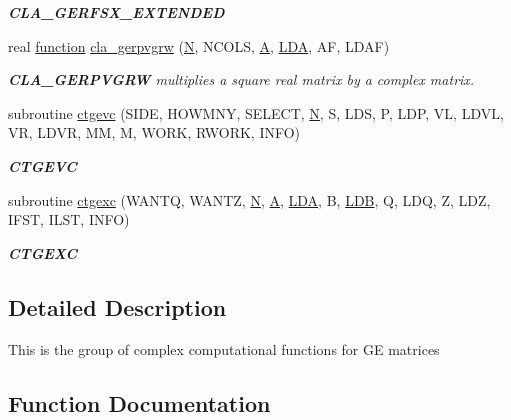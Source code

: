 \begin{DoxyCompactItemize}
\begin{DoxyCompactList}\small\item\em {\bfseries C\+L\+A\+\_\+\+G\+E\+R\+F\+S\+X\+\_\+\+E\+X\+T\+E\+N\+D\+E\+D} \end{DoxyCompactList}\item 
real \hyperlink{afunc_8m_a7b5e596df91eadea6c537c0825e894a7}{function} \hyperlink{group__complexGEcomputational_ga30ebdf9137986a237c939500cbd46a41}{cla\+\_\+gerpvgrw} (\hyperlink{polmisc_8c_a0240ac851181b84ac374872dc5434ee4}{N}, N\+C\+O\+L\+S, \hyperlink{classA}{A}, \hyperlink{example__user_8c_ae946da542ce0db94dced19b2ecefd1aa}{L\+D\+A}, A\+F, L\+D\+A\+F)
\begin{DoxyCompactList}\small\item\em {\bfseries C\+L\+A\+\_\+\+G\+E\+R\+P\+V\+G\+R\+W} multiplies a square real matrix by a complex matrix. \end{DoxyCompactList}\item 
subroutine \hyperlink{group__complexGEcomputational_gac7a0174fe570275f9380f138d536014e}{ctgevc} (S\+I\+D\+E, H\+O\+W\+M\+N\+Y, S\+E\+L\+E\+C\+T, \hyperlink{polmisc_8c_a0240ac851181b84ac374872dc5434ee4}{N}, S, L\+D\+S, P, L\+D\+P, V\+L, L\+D\+V\+L, V\+R, L\+D\+V\+R, M\+M, M, W\+O\+R\+K, R\+W\+O\+R\+K, I\+N\+F\+O)
\begin{DoxyCompactList}\small\item\em {\bfseries C\+T\+G\+E\+V\+C} \end{DoxyCompactList}\item 
subroutine \hyperlink{group__complexGEcomputational_ga940fe176c0f222043756578707ac989c}{ctgexc} (W\+A\+N\+T\+Q, W\+A\+N\+T\+Z, \hyperlink{polmisc_8c_a0240ac851181b84ac374872dc5434ee4}{N}, \hyperlink{classA}{A}, \hyperlink{example__user_8c_ae946da542ce0db94dced19b2ecefd1aa}{L\+D\+A}, B, \hyperlink{example__user_8c_a50e90a7104df172b5a89a06c47fcca04}{L\+D\+B}, Q, L\+D\+Q, Z, L\+D\+Z, I\+F\+S\+T, I\+L\+S\+T, I\+N\+F\+O)
\begin{DoxyCompactList}\small\item\em {\bfseries C\+T\+G\+E\+X\+C} \end{DoxyCompactList}\end{DoxyCompactItemize}


\subsection{Detailed Description}
This is the group of complex computational functions for G\+E matrices 

\subsection{Function Documentation}
\hypertarget{group__complexGEcomputational_ga7b18618f418e36eb2d8cfa0cae8fed3b}{}
